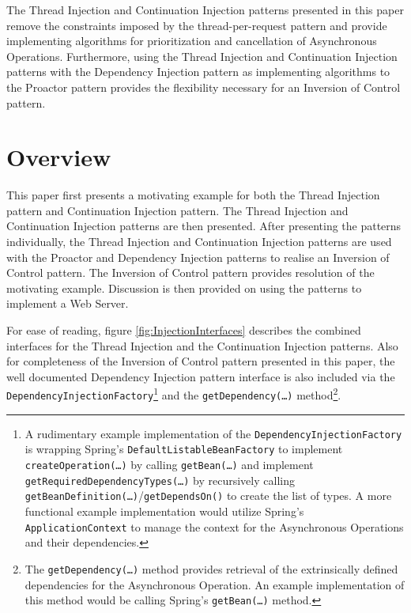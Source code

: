 \documentclass[prodmode]{style/acmlarge}
\begin{document}
The Thread Injection and Continuation Injection patterns presented in this paper
remove the constraints imposed by the thread-per-request pattern and provide
implementing algorithms for prioritization and cancellation of Asynchronous
Operations.  Furthermore, using the Thread Injection and Continuation Injection
patterns with the Dependency Injection pattern \cite{ioc} as implementing
algorithms to the Proactor pattern provides the flexibility necessary for an
Inversion of Control pattern.


\section{Overview}

This paper first presents a motivating example for both the Thread Injection
pattern and Continuation Injection pattern.  The Thread Injection and
Continuation Injection patterns are then presented.  After presenting the
patterns individually, the Thread Injection and Continuation Injection patterns
are used with the Proactor and Dependency Injection patterns to realise an
Inversion of Control pattern.  The Inversion of Control pattern provides
resolution of the motivating example.  Discussion is then provided on using the
patterns to implement a Web Server.

For ease of reading, figure \ref{fig:InjectionInterfaces} describes the combined
interfaces for the Thread Injection and the Continuation Injection patterns.
Also for completeness of the Inversion of Control pattern presented in this
paper, the well documented Dependency Injection pattern \cite{ioc} interface is
also included via the \texttt{DependencyInjectionFactory}\footnote{A rudimentary
example implementation of the \texttt{DependencyInjectionFactory} is wrapping
Spring's \cite{spring} \texttt{DefaultListableBeanFactory} to implement
\texttt{createOperation(\ldots)} by calling \texttt{getBean(\ldots)} and
implement \texttt{getRequiredDependencyTypes(\ldots)} by recursively calling
\texttt{getBeanDefinition(\ldots)}/\texttt{getDependsOn()} to create the list of
types.  A more functional example implementation would utilize Spring's
\texttt{ApplicationContext} to manage the context for the Asynchronous
Operations and their dependencies.} and the \texttt{getDependency(\ldots)}
method\footnote{The \texttt{getDependency(\ldots)} method provides retrieval of
the extrinsically defined dependencies for the Asynchronous Operation.  An
example implementation of this method would be calling Spring's \cite{spring}
\texttt{getBean(\ldots)} method.}.
\end{document}
